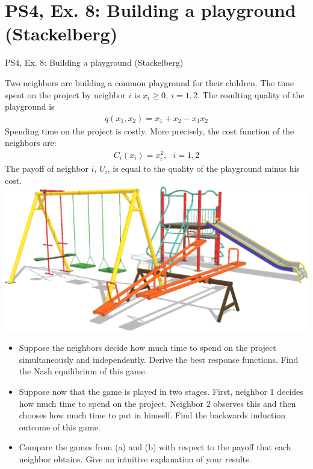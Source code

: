 \section{PS4, Ex. 8: Building a playground (Stackelberg)}

\begin{frame}{PS4, Ex. 8: Building a playground (Stackelberg)}
  \begin{multicols}{2}
    Two neighbors are building a common playground for their children. The time spent on the project by neighbor $i$ is $x_i \geq 0,\ i = 1, 2$. The resulting quality of the playground is
    \begin{align*}
      q(x_1,x_2)=x_1+x_2-x_1x_2
    \end{align*}
    Spending time on the project is costly. More precisely, the cost function of the neighbors are:
    \begin{align*}
      C_i(x_i)=x_i^2,\ \ \ i=1,2
    \end{align*}
    The payoff of neighbor $i$, $U_i$, is equal to the quality of the playground minus his cost.
    \includegraphics[width=\columnwidth]{figures/playground}
  \vfill\null \columnbreak
    \begin{itemize}
      \item[(a)] Suppose the neighbors decide how much time to spend on the project simultaneously and independently. Derive the best response functions. Find the Nash equilibrium of this game.
      \item[(b)] Suppose now that the game is played in two stages. First, neighbor 1 decides how much time to spend on the project. Neighbor 2 observes this and then chooses how much time to put in himself. Find the backwards induction outcome of this game.
      \item[(c)] Compare the games from (a) and (b) with respect to the payoff that each neighbor obtains. Give an intuitive explanation of your results.
    \end{itemize}
  \vfill\null
  \end{multicols}
\end{frame}


